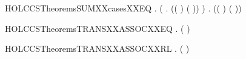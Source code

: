 \newcommand{\HOLCCSTheoremsSUMXXcases}{\UseVerbatim{HOLCCSTheoremsSUMXXcases}}
\begin{SaveVerbatim}{HOLCCSTheoremsSUMXXcasesXXEQ}
\HOLTokenTurnstile{} \HOLSymConst{\HOLTokenForall{}}   .
        \HOLSymConst{\ensuremath{+}}  \HOLTokenTransBegin{}\HOLTokenTransEnd {} \HOLSymConst{\HOLTokenEquiv{}}
       (\HOLSymConst{\HOLTokenExists{}} . (( \HOLSymConst{=} ) \HOLSymConst{\HOLTokenConj{}} ( \HOLSymConst{=} )) \HOLSymConst{\HOLTokenConj{}}  \HOLTokenTransBegin{}\HOLTokenTransEnd {}) \HOLSymConst{\HOLTokenDisj{}}
       \HOLSymConst{\HOLTokenExists{}} . (( \HOLSymConst{=} ) \HOLSymConst{\HOLTokenConj{}} ( \HOLSymConst{=} )) \HOLSymConst{\HOLTokenConj{}}  \HOLTokenTransBegin{}\HOLTokenTransEnd {}
\end{SaveVerbatim}
\newcommand{\HOLCCSTheoremsSUMXXcasesXXEQ}{\UseVerbatim{HOLCCSTheoremsSUMXXcasesXXEQ}}
\begin{SaveVerbatim}{HOLCCSTheoremsTRANSXXASSOCXXEQ}
\HOLTokenTurnstile{} \HOLSymConst{\HOLTokenForall{}}    .  \HOLSymConst{\ensuremath{+}}  \HOLSymConst{\ensuremath{+}}  \HOLTokenTransBegin{}\HOLTokenTransEnd {} \HOLSymConst{\HOLTokenEquiv{}}  \HOLSymConst{\ensuremath{+}} ( \HOLSymConst{\ensuremath{+}} ) \HOLTokenTransBegin{}\HOLTokenTransEnd {}
\end{SaveVerbatim}
\newcommand{\HOLCCSTheoremsTRANSXXASSOCXXEQ}{\UseVerbatim{HOLCCSTheoremsTRANSXXASSOCXXEQ}}
\begin{SaveVerbatim}{HOLCCSTheoremsTRANSXXASSOCXXRL}
\HOLTokenTurnstile{} \HOLSymConst{\HOLTokenForall{}}    .  \HOLSymConst{\ensuremath{+}} ( \HOLSymConst{\ensuremath{+}} ) \HOLTokenTransBegin{}\HOLTokenTransEnd {} \HOLSymConst{\HOLTokenImp{}}  \HOLSymConst{\ensuremath{+}}  \HOLSymConst{\ensuremath{+}}  \HOLTokenTransBegin{}\HOLTokenTransEnd {}
\end{SaveVerbatim}
